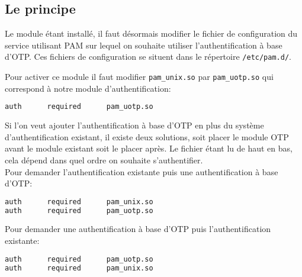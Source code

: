 \documentclass{"../../../res/univ-projet"}
\begin{document}
\newpage

\subsection{Le principe}
Le module étant installé, il faut désormais modifier le fichier de 
configuration du service utilisant PAM sur lequel on souhaite utiliser 
l'authentification à base d'OTP. Ces fichiers de configuration se situent 
dans le répertoire \verb?/etc/pam.d/?.

Pour activer ce module il faut modifier \verb?pam_unix.so? par \verb?pam_uotp.so?  
qui correspond à notre module d'authentification:

\begin{lstlisting}[language=bash, backgroundcolor=\color{black}, basicstyle=\color{white}]
auth      required      pam_uotp.so 
\end{lstlisting}

Si l'on veut ajouter l'authentification à base d'OTP en plus du système 
d'authentification existant, il existe deux solutions, soit placer le module OTP 
avant le module existant soit le placer après. Le fichier étant lu de haut en bas, 
cela dépend dans quel ordre on souhaite s'authentifier.\\
Pour demander l'authentification existante puis une authentification à base d'OTP: 
\begin{lstlisting}[language=bash, backgroundcolor=\color{black}, basicstyle=\color{white}]
auth      required      pam_unix.so
auth      required      pam_uotp.so
\end{lstlisting}
\newpage
Pour demander une authentification à base d'OTP puis l'authentification existante:
\begin{lstlisting}[language=bash, backgroundcolor=\color{black}, basicstyle=\color{white}]
auth      required      pam_uotp.so
auth      required      pam_unix.so
\end{lstlisting}
\end{document}
